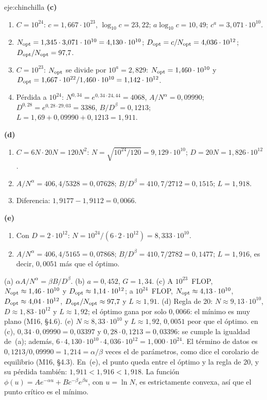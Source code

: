 \begin{solucion}{eje:chinchilla}
\noindent\textbf{(c)}
\begin{enumerate}[label=\arabic*.]
  \item $C=10^{24}$: $c=1{,}667\cdot 10^{23}$, $\log_{10}c=23{,}22$; $a\log_{10}c=10{,}49$; $c^{a}=3{,}071\cdot 10^{10}$.
  \item $N_{\mathrm{opt}}=1{,}345\cdot 3{,}071\cdot 10^{10}=4{,}130\cdot 10^{10}$; $D_{\mathrm{opt}}=c/N_{\mathrm{opt}}=4{,}036\cdot 10^{12}$; $D_{\mathrm{opt}}/N_{\mathrm{opt}}=97{,}7$.
  \item $C=10^{23}$: $N_{\mathrm{opt}}$ se divide por $10^{a}=2{,}829$: $N_{\mathrm{opt}}=1{,}460\cdot 10^{10}$ y $D_{\mathrm{opt}}=1{,}667\cdot 10^{22}/1{,}460\cdot 10^{10}=1{,}142\cdot 10^{12}$.
  \item Pérdida a $10^{24}$: $N^{0{,}34}=e^{0{,}34\cdot 24{,}44}=4068$, $A/N^{\alpha}=0{,}09990$; $D^{0{,}28}=e^{0{,}28\cdot 29{,}03}=3386$, $B/D^{\beta}=0{,}1213$; $L=1{,}69+0{,}09990+0{,}1213=1{,}911$.
\end{enumerate}

\noindent\textbf{(d)}
\begin{enumerate}[label=\arabic*.]
  \item $C=6N\cdot 20N=120N^{2}$: $N=\sqrt{10^{24}/120}=9{,}129\cdot 10^{10}$; $D=20N=1{,}826\cdot 10^{12}$.
  \item $A/N^{\alpha}=406{,}4/5328=0{,}07628$; $B/D^{\beta}=410{,}7/2712=0{,}1515$; $L=1{,}918$.
  \item Diferencia: $1{,}9177-1{,}9112=0{,}0066$.
\end{enumerate}

\noindent\textbf{(e)}
\begin{enumerate}[label=\arabic*.]
  \item Con $D=2\cdot 10^{12}$: $N=10^{24}/(6\cdot 2\cdot 10^{12})=8{,}333\cdot 10^{10}$.
  \item $A/N^{\alpha}=406{,}4/5165=0{,}07868$; $B/D^{\beta}=410{,}7/2782=0{,}1477$; $L=1{,}916$, es decir, $0{,}0051$ más que el óptimo.
\end{enumerate}
\resultado (a) $\alpha A/N^{\alpha}=\beta B/D^{\beta}$. (b) $a=0{,}452$, $G=1{,}34$. (c) A $10^{23}$~FLOP, $N_{\mathrm{opt}}\approx 1{,}46\cdot 10^{10}$ y $D_{\mathrm{opt}}\approx 1{,}14\cdot 10^{12}$; a $10^{24}$~FLOP, $N_{\mathrm{opt}}\approx 4{,}13\cdot 10^{10}$, $D_{\mathrm{opt}}\approx 4{,}04\cdot 10^{12}$, $D_{\mathrm{opt}}/N_{\mathrm{opt}}\approx 97{,}7$ y $L\approx 1{,}91$. (d) Regla de 20: $N\approx 9{,}13\cdot 10^{10}$, $D\approx 1{,}83\cdot 10^{12}$ y $L\approx 1{,}92$; el óptimo gana por solo $0{,}0066$: el mínimo es muy plano (M16, §4.6). (e) $N\approx 8{,}33\cdot 10^{10}$ y $L\approx 1{,}92$, $0{,}0051$ peor que el óptimo.
\comprobacion en (c), $0{,}34\cdot 0{,}09990=0{,}03397$ y $0{,}28\cdot 0{,}1213=0{,}03396$: se cumple la igualdad de~(a); además, $6\cdot 4{,}130\cdot 10^{10}\cdot 4{,}036\cdot 10^{12}=1{,}000\cdot 10^{24}$. El término de datos es $0{,}1213/0{,}09990=1{,}214=\alpha/\beta$ veces el de parámetros, como dice el corolario de equilibrio (M16, §4.3). En~(e), el punto queda entre el óptimo y la regla de 20, y su pérdida también: $1{,}911<1{,}916<1{,}918$. La función $\phi(u)=Ae^{-\alpha u}+Bc^{-\beta}e^{\beta u}$, con $u=\ln N$, es estrictamente convexa, así que el punto crítico es el mínimo.


\end{solucion}

